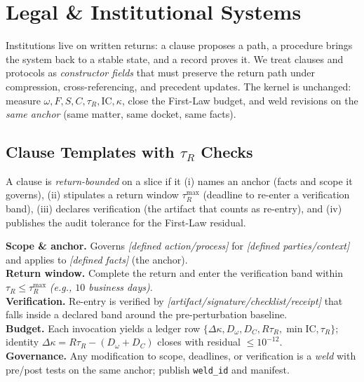 \chapter{Legal \& Institutional Systems}
\label{ch:legal}

Institutions live on written returns: a clause proposes a path, a procedure brings the system back to a stable state, and a record proves it. We treat clauses and protocols as \emph{constructor fields} that must preserve the return path under compression, cross-referencing, and precedent updates. The kernel is unchanged: measure \(\omega,F,S,C,\tau_{R},\mathrm{IC},\kappa\), close the First-Law budget, and weld revisions on the \emph{same anchor} (same matter, same docket, same facts).

\section{Clause Templates with \texorpdfstring{$\tau_R$}{tauR} Checks}
\label{sec:legal-clauses}

\begin{definition}
A clause is \emph{return-bounded} on a slice if it (i) names an anchor (facts and scope it governs), (ii) stipulates a return window \(\tau_R^{\max}\) (deadline to re-enter a verification band), (iii) declares verification (the artifact that counts as re-entry), and (iv) publishes the audit tolerance for the First-Law residual.
\end{definition}

\begin{eqbox}
\textbf{Scope \& anchor.} Governs \emph{[defined action/process]} for \emph{[defined parties/context]} and applies to \emph{[defined facts]} (the anchor).\\
\textbf{Return window.} Complete the return and enter the verification band within \(\tau_R \le \tau_R^{\max}\) \emph{(e.g., \(10\) business days)}.\\
\textbf{Verification.} Re-entry is verified by \emph{[artifact/signature/checklist/receipt]} that falls inside a declared band around the pre-perturbation baseline.\\
\textbf{Budget.} Each invocation yields a ledger row \(\{\Delta\kappa,D_\omega,D_C,R\tau_R,\min\mathrm{IC},\tau_R\}\); identity \(\Delta\kappa=R\tau_R-(D_\omega+D_C)\) closes with residual \(\le 10^{-12}\).\\
\textbf{Governance.} Any modification to scope, deadlines, or verification is a \emph{weld} with pre/post tests on the same anchor; publish \texttt{weld\_id} and manifest.
\end{eqbox}

